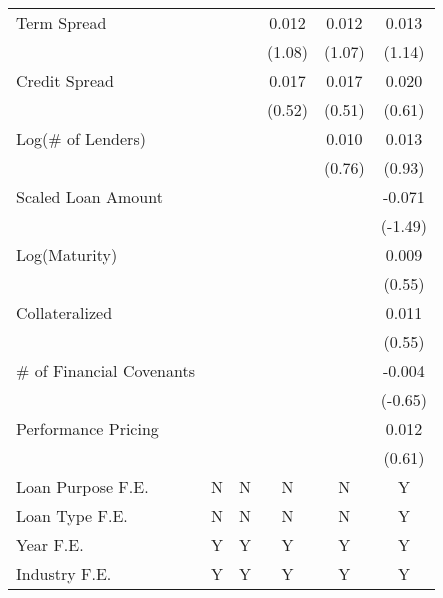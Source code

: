 {\begin{tabular}{l*{5}{c}}
Term Spread     &                  &                  &    0.012         &    0.012         &    0.013         \\
                &                  &                  &   (1.08)         &   (1.07)         &   (1.14)         \\
Credit Spread   &                  &                  &    0.017         &    0.017         &    0.020         \\
                &                  &                  &   (0.52)         &   (0.51)         &   (0.61)         \\
Log(\# of Lenders)&                  &                  &                  &    0.010         &    0.013         \\
                &                  &                  &                  &   (0.76)         &   (0.93)         \\
Scaled Loan Amount&                  &                  &                  &                  &   -0.071         \\
                &                  &                  &                  &                  &  (-1.49)         \\
Log(Maturity)   &                  &                  &                  &                  &    0.009         \\
                &                  &                  &                  &                  &   (0.55)         \\
Collateralized  &                  &                  &                  &                  &    0.011         \\
                &                  &                  &                  &                  &   (0.55)         \\
\# of Financial Covenants&                  &                  &                  &                  &   -0.004         \\
                &                  &                  &                  &                  &  (-0.65)         \\
Performance Pricing&                  &                  &                  &                  &    0.012         \\
                &                  &                  &                  &                  &   (0.61)         \\
\midrule Loan Purpose F.E.&        N         &        N         &        N         &        N         &        Y         \\
Loan Type F.E.  &        N         &        N         &        N         &        N         &        Y         \\
Year F.E.       &        Y         &        Y         &        Y         &        Y         &        Y         \\
Industry F.E.   &        Y         &        Y         &        Y         &        Y         &        Y         \\


\end{tabular}}

